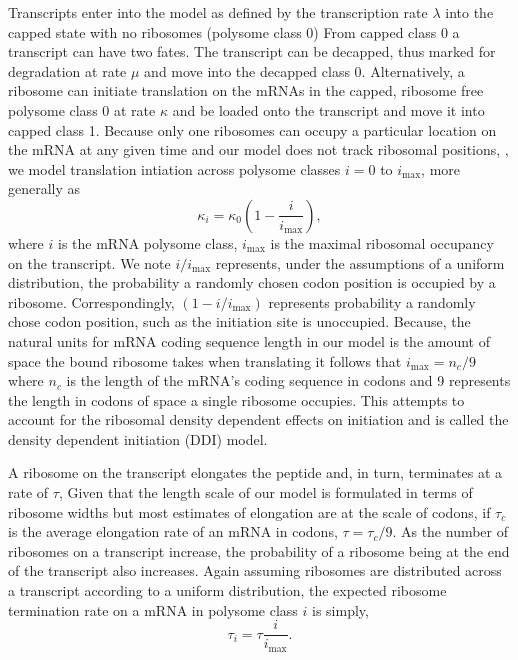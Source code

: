 \documentclass[review]{elsarticle}
\newcommand{\imax}{\ensuremath{{i_{\max}}}\xspace}
\begin{document}
Transcripts enter into the model as defined by the transcription rate $\lambda$ into the capped state with no ribosomes (polysome class 0)
From capped class 0 a transcript can have two fates. 
The transcript can be decapped, thus marked for degradation at rate $\mu$ and move into the decapped class 0.
Alternatively, a ribosome can initiate translation on the mRNAs in the capped, ribosome free polysome class 0 at rate $\kappa$ and be loaded onto the transcript and move it into capped class 1.
Because only one ribosomes can occupy a particular location on the mRNA at any given time and our model does not track ribosomal positions,
, we model translation intiation across polysome classes $i = 0$ to $\imax$, more generally as
\begin{equation}
  \label{eq:kappa_i}
  \kappa_i = \kappa_0 \left(1- \frac{i}{\imax}\right),
\end{equation}
where $i$ is the mRNA polysome class, \imax is the maximal ribosomal occupancy on the transcript.
We note $i/\imax$ represents, under the assumptions of a uniform distribution,  the probability a randomly chosen codon position is occupied by a ribosome.
Correspondingly, $(1 - i/\imax)$ represents probability a randomly chose codon position, such as the initiation site is unoccupied.
Because, the natural units for mRNA coding sequence length in our model is the amount of space the bound ribosome takes when translating it follows that $\imax = n_{c}/9$ where $n_{c}$ is the length of the mRNA's coding sequence in codons and 9 represents the length in codons of space a single ribosome occupies.
This attempts to account for the ribosomal density dependent effects on initiation and is called the density dependent initiation (DDI) model.


A ribosome on the transcript elongates the peptide and, in turn, terminates at a rate of $\tau$, 
Given that the length scale of our model is formulated in terms of ribosome widths but most estimates of elongation are at the scale of codons, if $\tau_c$ is the average elongation rate of an mRNA in codons, $\tau = \tau_c/9$.
As the number of ribosomes on a transcript increase, the probability of a ribosome being at the end of the transcript also increases.
Again assuming ribosomes are distributed across a transcript according to a uniform distribution, the expected ribosome termination rate on a mRNA in polysome class $i$ is simply, 
\begin{equation}
	\tau_i = \tau \frac{i}{\imax}.
\end{equation}
\end{document}
